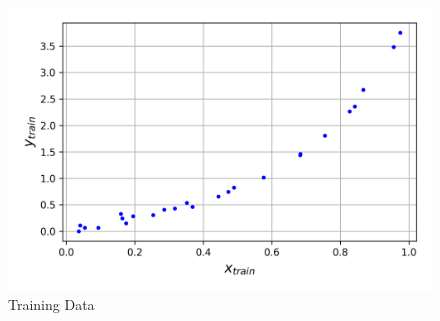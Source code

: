 \documentclass[a4paper,11pt]{article}%
\begin{document}
%

\begin{figure}[h]
	\centering
		\includegraphics[width=0.7\linewidth]{figures/training_data}
	\caption{Training Data}
\end{figure}
    
\end{document}
